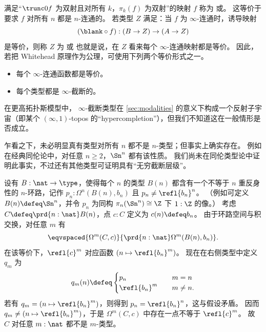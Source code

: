 满足“$\trunc0f$ 为双射且对所有 $k$，$\pi_k(f)$ 为双射”的映射 $f$ 称为%
%
或。%
%
这等价于要求 $f$ 对所有 $n$ 都是 $n$-连通的。
若类型 $Z$ 满足：当 $f$ 为 $\infty$-连通时，诱导映射
\[(\blank\circ f):(B\to Z) \to (A\to Z)\]
是等价，则称 $Z$ 为%
%
或%
%
也就是说，在 $Z$ 看来每个 $\infty$-连通映射都是等价。
%
因此，若把 Whitehead 原理作为公理，可使用下列两个等价形式之一。
\begin{itemize}
\item 每个 $\infty$-连通函数都是等价。
\item 每个类型都是 $\infty$-截断的。
\end{itemize}
在更高拓扑斯模型中，
%
$\infty$-截断类型在 \cref{sec:modalities} 的意义下构成一个反射子宇宙（即某个 $(\infty,1)$-topos 的“hypercompletion”），但我们不知道这在一般情形是否成立。

%
%

乍看之下，未必明显真有类型对所有 $n$ 都不是 $n$-类型；但事实上确实存在。
例如在经典同伦论中，对任意 $n\ge 2$，$\Sn^n$ 都有该性质。
我们尚未在同伦类型论中证明此事实，不过还有其他类型可证明具有“无穷截断层级”。

\begin{eg}
  设有 $B:\nat\to\type$，使得每个 $n$ 的类型 $B(n)$ 都含有一个不等于 $n$ 重反身性的 $n$-环路，记作 $p_n:\Omega^n(B(n),b_n)$ 且 $p_n \neq \refl{b_n}^n$。
  （例如可定义 $B(n)\defeq \Sn^n$，并令 $p_n$ 为同构 $\pi_n(\Sn^n)\cong \Z$ 下 $1:\Z$ 的像。）
  考虑 $C\defeq \prd{n:\nat} B(n)$，点 $c:C$ 定义为 $c(n)\defeq b_n$。
  由于环路空间与积交换，对任意 $m$ 有
  \[\eqvspaced{\Omega^m (C,c)}{\prd{n:\nat}\Omega^m(B(n),b_n)}.\]
  在该等价下，$\refl{c}^m$ 对应函数 $(n\mapsto \refl{b_n}^m)$。
  现在在右侧类型中定义 $q_m$ 为
  \[ q_m(n) \defeq
  \begin{cases}
    p_n &\quad m=n\\
    \refl{b_n}^m &\quad m\neq n.
  \end{cases}
  \]
  若有 $q_m = (n\mapsto \refl{b_n}^m)$，则得到 $p_n = \refl{b_n}^n$，这与假设矛盾。
  因而 $q_m \neq (n\mapsto \refl{b_n}^m)$，于是 $\Omega^m(C,c)$ 中存在一点不等于 $\refl{c}^m$。
  故 $C$ 对任意 $m:\nat$ 都不是 $m$-类型。
\end{eg}


